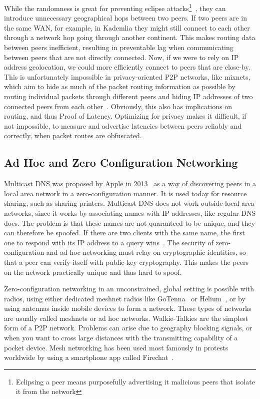 While the randomness is great for preventing eclipse attacks\footnote{Eclipsing a peer means purposefully advertising it malicious peers that isolate it from the network}~\cite{Cai2015-ra}, they can introduce unnecessary geographical hops between two peers. If two peers are in the same WAN, for example, in Kademlia they might still connect to each other through a network hop going through another continent. This makes routing data between peers inefficient, resulting in preventable lag when communicating between peers that are not directly connected.
Now, if we were to rely on IP address geolocation, we could more efficiently connect to peers that are close-by. This is unfortunately impossible in privacy-oriented P2P networks, like mixnets, which aim to hide as much of the packet routing information as possible by routing individual packets through different peers and hiding IP addresses of two connected peers from each other~\cite{Harry_Halpin_undated-sq}. Obviously, this also has implications on routing, and thus Proof of Latency. Optimizing for privacy makes it difficult, if not impossible, to measure and advertise latencies between peers reliably and correctly, when packet routes are obfuscated.

\subsection{Ad Hoc and Zero Configuration Networking}
Multicast DNS was proposed by Apple in 2013~\cite{Cheshire2013-ja} as a way of discovering peers in a local area network in a zero-configuration manner. It is used today for resource sharing, such as sharing printers. Multicast DNS does not work outside local area networks, since it works by associating names with IP addresses, like regular DNS does. The problem is that these names are not quaranteed to be unique, and they can therefore be spoofed. If there are two clients with the same name, the first one to respond with its IP address to a query wins~\cite{Pdp2008-tg}. The security of zero-configuration and ad hoc networking must relay on cryptographic identities, so that a peer can verify itself with public-key cryptography. This makes the peers on the network practically unique and thus hard to spoof.

Zero-configuration networking in an unconstrained, global setting is possible with radios, using either dedicated meshnet radios like GoTenna~\cite{GoTenna_undated-km} or Helium~\cite{Helium_undated-jv}, or by using antennas inside mobile devices to form a network. These types of networks are usually called meshnets or ad hoc networks. Walkie-Talkies are the simplest form of a P2P network. Problems can arise due to geography blocking signals, or when you want to cross large distances with the transmitting capability of a pocket device. Mesh networking has been used most famously in protests worldwide by using a smartphone app called Firechat~\cite{Milian2014-mt}.

